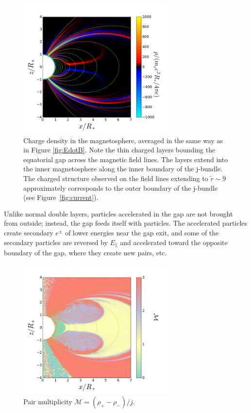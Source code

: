 \begin{figure}[t]
  \centering
  \includegraphics[width=0.7\textwidth]{pics/chap4/Rho.png}
  \caption[Charge density in magnetar magnetosphere]{Charge density in the magnetosphere, averaged in the
    same way as in Figure \ref{fig:EdotB}. Note the thin charged layers bounding
    the equatorial gap across the magnetic field lines. The layers extend into
    the inner magnetosphere along the inner boundary of the j-bundle. The
    charged structure observed on the field lines extending to $\tilde{r}\sim 9$
    approximately corresponds to the outer boundary of the j-bundle (see
    Figure~\ref{fig:current}).}
  \label{fig:rho}
\end{figure}

Unlike normal double layers, particles accelerated in the gap are not brought
from outside; instead, the gap feeds itself with particles. The accelerated
particles create secondary $e^\pm$ of lower energies near the gap exit, and some
of the secondary particles are reversed by $E_\parallel$ and accelerated toward
the opposite boundary of the gap, where they create new pairs, etc.


\begin{figure}[t]
  \centering
  \includegraphics[width=0.7\textwidth]{pics/chap4/multiplicity.png}
  \caption[Magnetar magnetospheric pair multiplicity]{Pair multiplicity
    $\mathcal{M} = (\rho_+ - \rho_{-})/j$.}
  \label{fig:multiplicity}
\end{figure}

